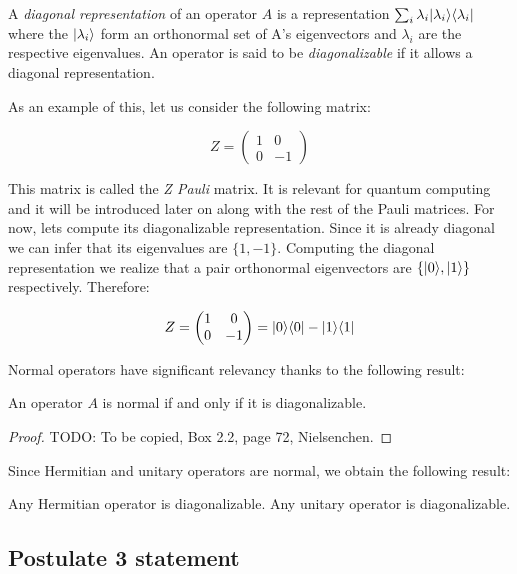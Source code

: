 \begin{definition}
	A \emph{diagonal representation} of an operator $A$ is a representation $\sum_i \lambda_i |\lambda_i\rangle\langle\lambda_i|$ where the $|\lambda_i\rangle$ form an orthonormal set of A's eigenvectors and $\lambda_i$ are the respective eigenvalues. An operator is said to be \emph{diagonalizable} if it allows a diagonal representation.
\end{definition}

\begin{exampleth}
	As an example of this, let us consider the following matrix:
	
	$$ Z = 
	\begin{pmatrix}
		1 & 0 \\
		0 & -1 
	\end{pmatrix}
	$$
	
	This matrix is called the \emph{Z Pauli} matrix. It is relevant for quantum computing and it will be introduced later on along with the rest of the Pauli matrices. For now, lets compute its diagonalizable representation. Since it is already diagonal we can infer that its eigenvalues are $\{1, -1\}$. Computing the diagonal representation we realize that a pair orthonormal eigenvectors are $\{|0\rangle, |1\rangle\}$ respectively. Therefore:
	
	$$ Z = 
	\begin{pmatrix}
		1 & 0 \\
		0 & -1 
	\end{pmatrix} = 
	|0\rangle\langle0| - |1\rangle\langle1|
	$$
\end{exampleth}

Normal operators have significant relevancy thanks to the following result:

\begin{theorem}
	An operator $A$ is normal if and only if it is diagonalizable.
\end{theorem}
\begin{proof}
	TODO: To be copied, Box 2.2, page 72, Nielsenchen.
\end{proof}

Since Hermitian and unitary operators are normal, we obtain the following result:

\begin{corollary}
	Any Hermitian operator is diagonalizable. Any unitary operator is diagonalizable.
\end{corollary}


\subsection{Postulate 3 statement}

